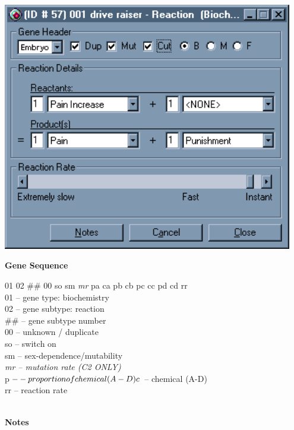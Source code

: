 \documentclass[11pt,twoside,a4paper]{article}
\begin{document}
\begin{minipage}[ht]{0.40\textwidth}
	\includegraphics[width=0.95\textwidth]{img/gen12k.png}
\end{minipage} \hfill \begin{minipage}[ht]{0.575\textwidth}
	\textbf{\large Gene Sequence} %

	01 02 \#\# 00 so sm \emph{mr} pa ca pb cb pc cc pd cd rr ~\\

	01 -- gene type: biochemistry ~\\
	02 -- gene subtype: reaction ~\\
	\#\# -- gene subtype number ~\\
	00 -- unknown / duplicate ~\\
	so -- switch on ~\\
	sm -- sex-dependence/mutability ~\\
	\emph{mr -- mutation rate (C2 ONLY)} ~\\
	p$ -- proportion of chemical (A-D) ~\\
	c$ -- chemical (A-D) ~\\
	rr -- reaction rate  ~\\
\end{minipage} ~\\

\textbf{\large Notes}

\end{document}
